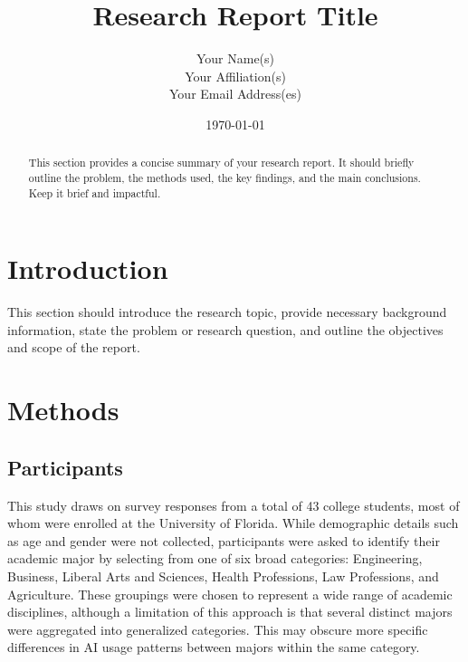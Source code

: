 \documentclass[12pt]{article}
\title{Research Report Title}
\author{Your Name(s) \\ Your Affiliation(s) \\ Your Email Address(es)}
\date{\today}
\begin{document}
\maketitle
\begin{abstract}
This section provides a concise summary of your research report. It should briefly outline the problem, the methods used, the key findings, and the main conclusions. Keep it brief and impactful.
\end{abstract}

\tableofcontents
\newpage

\section{Introduction}
\label{sec:introduction}
This section should introduce the research topic, provide necessary background information, state the problem or research question, and outline the objectives and scope of the report.

\section{Methods}
\label{sec:methods}

\subsection{Participants}
\label{subsec:participants}
This study draws on survey responses from a total of 43 college students, most of whom were enrolled at the University of Florida. While demographic details such as age and gender were not collected, participants were asked to identify their academic major by selecting from one of six broad categories: Engineering, Business, Liberal Arts and Sciences, Health Professions, Law Professions, and Agriculture. These groupings were chosen to represent a wide range of academic disciplines, although a limitation of this approach is that several distinct majors were aggregated into generalized categories. This may obscure more specific differences in AI usage patterns between majors within the same category.
\end{document}
